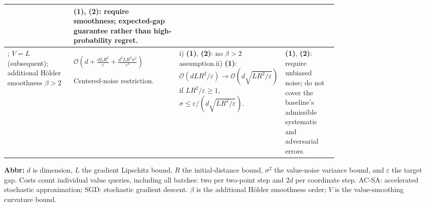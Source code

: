 \begin{table}[tp]
\begin{threeparttable}
\begin{tabularx}{\linewidth}{@{}>{\raggedright\arraybackslash}p{0.20\linewidth}>{\raggedright\arraybackslash}p{0.32\linewidth}>{\raggedright\arraybackslash}p{0.25\linewidth}>{\raggedright\arraybackslash}X@{}}
& \textbf{(1)}, \textbf{(2)}: require smoothness; expected-gap guarantee rather than high-probability regret. \\
\midrule
\citep[Thm.~4(b)]{zoLoginov2026v1}; $V=L$ (subsequent); additional H\"older smoothness $\beta>2$
& $\mathcal{O}\!\left(d+\frac{dLR^2}{\varepsilon}+\frac{d^2LR^2\sigma^2}{\varepsilon^3}\right)$\par Centered-noise restriction.
& i) \textbf{(1)}, \textbf{(2)}: no $\beta>2$ assumption.\newline ii) \textbf{(1)}: $\mathcal{O}\!(dLR^2/\varepsilon)\to\mathcal{O}\!(d\sqrt{LR^2/\varepsilon})$ if $LR^2/\varepsilon\ge1$, $\sigma\le\varepsilon/(d\sqrt{LR^2/\varepsilon})$.
& \textbf{(1)}, \textbf{(2)}: require unbiased noise; do not cover the baseline's admissible systematic and adversarial errors. \\
\bottomrule
\end{tabularx}
\begin{tablenotes}[flushleft]\footnotesize
\item[] \textbf{Abbr:} $d$ is dimension, $L$ the gradient Lipschitz bound, $R$ the initial-distance bound, $\sigma^2$ the value-noise variance bound, and $\varepsilon$ the target gap. Costs count individual value queries, including all batches: two per two-point step and $2d$ per coordinate step. AC-SA: accelerated stochastic approximation; SGD: stochastic gradient descent. $\beta$ is the additional H\"older smoothness order; $V$ is the value-smoothing curvature bound.
\end{tablenotes}
\end{threeparttable}
\end{table}
\clearpage
